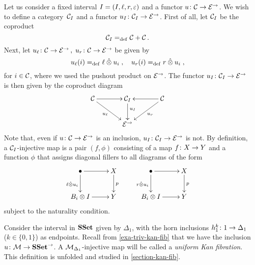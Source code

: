 \documentclass[reqno,10pt,a4paper,oneside]{amsart}
\begin{document}
Let us consider a fixed interval $\interval = (\interval, \intervall, \intervalr, \varepsilon)$ and a functor $u \co \cal{C} \to \catE^\to$. We wish to define a category~$\cal{C}_\interval$ and a functor $u_\interval \co \cal{C}_\interval \to \catE^\to$. First of all, let $\cal{C}_\interval$ be the coproduct
 \[
 \cal{C}_\interval  \defeq \cal{C} + \cal{C} \, .
 \] 
 Next, let $u_{\intervall} \co \cal{C} \to \catE^\to \, , \; u_{\intervalr} \co \cal{C} \to \catE^\to$ be given by
 \[
u_{\intervall}(i) \defeq  \intervall \hatotimes u_i \; , \quad
u_{\intervalr}(i) \defeq  \intervalr \hatotimes u_i \; , 
\]
for $i \in \cal{C}$, where we used the pushout product on $\catE^\to$. The functor $u_\interval \co \cal{C}_\interval \to \catE^\to$ is then given by the coproduct diagram
\begin{equation}
\label{equ:u-interval}
\vcenter{\hbox{\xymatrix@C=1.2cm{
\cal{C} \ar[r] \ar[dr]_-{u_\intervall} & \cal{C}_\interval \ar[d]^(.4){u_\interval} & \cal{C} \ar[dl]^-{u_\intervalr} \ar[l] \\ 
 & \catE^\to }}}
\end{equation}
Note that, even if $u \co \cal{C} \to \catE^\to$ is an inclusion, $u_\interval \co \cal{C}_\interval \to \catE^\to$ is not.
By definition, a $\cal{C}_\interval$-injective map is a pair $(f, \phi)$ consisting of a map $f \co X \to Y$ and a function $\phi$ that assigns diagonal fillers to all diagrams of the form
\[
\xymatrix{
\bullet \ar[r] \ar[d]_{\intervall \hatotimes u_i} & X \ar[d]^p \\
B_i \otimes \interval \ar[r] & Y} \qquad \xymatrix{
\bullet \ar[r] \ar[d]_{\intervalr \hatotimes u_i} & X \ar[d]^p \\
B_i \otimes \interval \ar[r] & Y}
\]
subject to the naturality condition. 

\begin{example} Consider the interval in $\SSet$ given by $\Delta_1$, with the horn inclusions 
$h^k_1 \co 1 \to \Delta_1$ ($k \in \{ 0, 1 \}$) as endpoints. Recall from \cref{exa-triv-kan-fib} that we
have the inclusion $u \co \cal{M} \to \SSet^\to$. A $\cal{M}_{\Delta_1}$-injective map will be called
a \emph{uniform Kan fibration}. This definition is unfolded and studied in \cref{section-kan-fib}. 
\end{example} 
  
  \medskip
  
\end{document}
